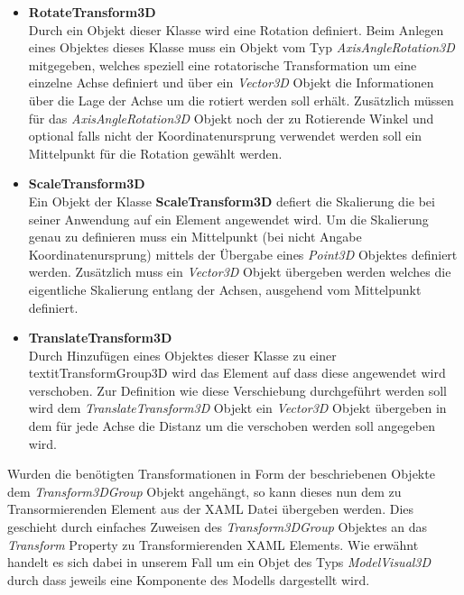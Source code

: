\begin{itemize}
\item \textbf{RotateTransform3D}\\
Durch ein Objekt dieser Klasse wird eine Rotation definiert. Beim Anlegen eines Objektes dieses Klasse muss ein Objekt vom Typ \textit{AxisAngleRotation3D} mitgegeben, welches speziell eine rotatorische Transformation um eine einzelne Achse definiert und über ein \textit{Vector3D} Objekt die Informationen über die Lage der Achse um die rotiert werden soll erhält. Zusätzlich müssen für das \textit{AxisAngleRotation3D} Objekt noch der zu Rotierende Winkel und optional falls nicht der Koordinatenursprung verwendet werden soll ein Mittelpunkt für die Rotation gewählt werden.

\item \textbf{ScaleTransform3D}\\
Ein Objekt der Klasse \textbf{ScaleTransform3D} defiert die Skalierung die bei seiner Anwendung auf ein Element angewendet wird. Um die Skalierung genau zu definieren muss ein Mittelpunkt (bei nicht Angabe Koordinatenursprung) mittels der Übergabe eines \textit{Point3D} Objektes definiert werden. Zusätzlich muss ein \textit{Vector3D} Objekt übergeben werden welches die eigentliche Skalierung entlang der Achsen, ausgehend vom Mittelpunkt definiert.

\item \textbf{TranslateTransform3D}\\
Durch Hinzufügen eines Objektes dieser Klasse zu einer \\textit{TransformGroup3D} wird das Element auf dass diese angewendet wird verschoben. Zur Definition wie diese Verschiebung durchgeführt werden soll wird dem \textit{TranslateTransform3D} Objekt ein \textit{Vector3D} Objekt übergeben in dem für jede Achse die Distanz um die verschoben werden soll angegeben wird.
\end{itemize}

Wurden die benötigten Transformationen in Form der beschriebenen Objekte dem \textit{ Transform3DGroup} Objekt angehängt, so kann dieses nun dem zu Transormierenden Element aus der XAML Datei übergeben werden. Dies geschieht durch einfaches Zuweisen des \textit{ Transform3DGroup} Objektes an das \textit{ Transform} Property zu Transformierenden XAML Elements. Wie erwähnt handelt es sich dabei in unserem Fall um ein Objet des Typs \textit{ModelVisual3D} durch dass jeweils eine Komponente des Modells dargestellt wird.



